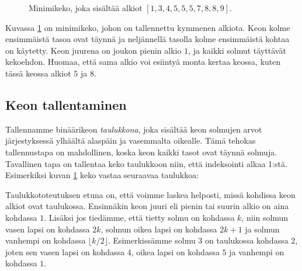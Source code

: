 \begin{figure}
\center
{}
\caption{Minimikeko, joka sisältää alkiot $[1,3,4,5,5,5,7,8,8,9]$.}
\label{fig:minkek}
\end{figure}

Kuvassa \ref{fig:minkek} on minimikeko,
johon on tallennettu kymmenen alkiota.
Keon kolme ensimmäistä tasoa ovat täynnä
ja neljännellä tasolla kolme ensimmäistä kohtaa on käytetty.
Keon juurena on joukon pienin alkio $1$,
ja kaikki solmut täyttävät kekoehdon.
Huomaa, että sama alkio voi esiintyä monta kertaa keossa,
kuten tässä keossa alkiot $5$ ja $8$.

\subsection{Keon tallentaminen}

Tallennamme binäärikeon \emph{taulukkona},
joka sisältää keon solmujen arvot jär\-jestyksessä
ylhäältä alaspäin ja vasemmalta oikealle.
Tämä tehokas tallennustapa on mahdollinen,
koska keon kaikki tasot ovat täynnä solmuja.
Tavallinen tapa on tallentaa keko taulukkoon niin,
että indeksointi alkaa 1:stä.
Esimerkiksi kuvan \ref{fig:minkek} keko vastaa seuraavaa taulukkoa:
\vspace{5px}


\vspace{5px}
Taulukkototeutuksen etuna on, että voimme laskea
helposti, missä kohdissa keon alkiot ovat taulukossa.
Ensinnäkin keon juuri eli pienin tai suurin alkio
on aina kohdassa $1$.
Lisäksi jos tiedämme, että tietty solmu on kohdassa $k$,
niin solmun vasen lapsi on kohdassa $2k$,
solmun oikea lapsi on kohdassa $2k+1$ ja
solmun vanhempi on kohdassa $\lfloor k/2 \rfloor$.
Esimerkissämme solmu $3$
on taulukossa kohdassa $2$,
joten sen vasen lapsi on kohdassa $4$,
oikea lapsi on kohdassa $5$ ja
vanhempi on kohdassa $1$.

